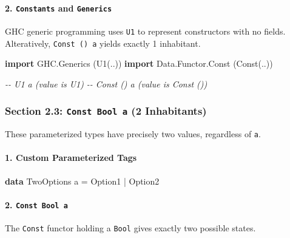 \documentclass[
]{article}
\newenvironment{Shaded}{}{}
\newcommand{\CommentTok}[1]{\textcolor[rgb]{0.38,0.63,0.69}{\textit{#1}}}
\newcommand{\DataTypeTok}[1]{\textcolor[rgb]{0.56,0.13,0.00}{#1}}
\newcommand{\KeywordTok}[1]{\textcolor[rgb]{0.00,0.44,0.13}{\textbf{#1}}}
\newcommand{\NormalTok}[1]{#1}
\newcommand{\OperatorTok}[1]{\textcolor[rgb]{0.40,0.40,0.40}{#1}}
\newcommand{\OtherTok}[1]{\textcolor[rgb]{0.00,0.44,0.13}{#1}}
\begin{document}
\paragraph{\texorpdfstring{2. \texttt{Constants} and
\texttt{Generics}}{2. Constants and Generics}}\label{constants-and-generics}

GHC generic programming uses \texttt{U1} to represent constructors with
no fields. Alteratively, \texttt{Const\ ()\ a} yields exactly 1
inhabitant.

\begin{Shaded}
\begin{Highlighting}[]
\KeywordTok{import} \DataTypeTok{GHC.Generics}\NormalTok{ (}\DataTypeTok{U1}\NormalTok{(..))}
\KeywordTok{import} \DataTypeTok{Data.Functor.Const}\NormalTok{ (}\DataTypeTok{Const}\NormalTok{(..))}

\CommentTok{{-}{-} U1 a (value is U1)}
\CommentTok{{-}{-} Const () a (value is Const ())}
\end{Highlighting}
\end{Shaded}

\subsubsection{\texorpdfstring{Section 2.3: \texttt{Const\ Bool\ a} (2
Inhabitants)}{Section 2.3: Const Bool a (2 Inhabitants)}}\label{section-2.3-const-bool-a-2-inhabitants}

These parameterized types have precisely two values, regardless of
\texttt{a}.

\paragraph{1. Custom Parameterized
Tags}\label{custom-parameterized-tags}

\begin{Shaded}
\begin{Highlighting}[]
\KeywordTok{data} \DataTypeTok{TwoOptions}\NormalTok{ a }\OtherTok{=} \DataTypeTok{Option1} \OperatorTok{|} \DataTypeTok{Option2}
\end{Highlighting}
\end{Shaded}

\paragraph{\texorpdfstring{2.
\texttt{Const\ Bool\ a}}{2. Const Bool a}}\label{const-bool-a}

The \texttt{Const} functor holding a \texttt{Bool} gives exactly two
possible states.
\end{document}
